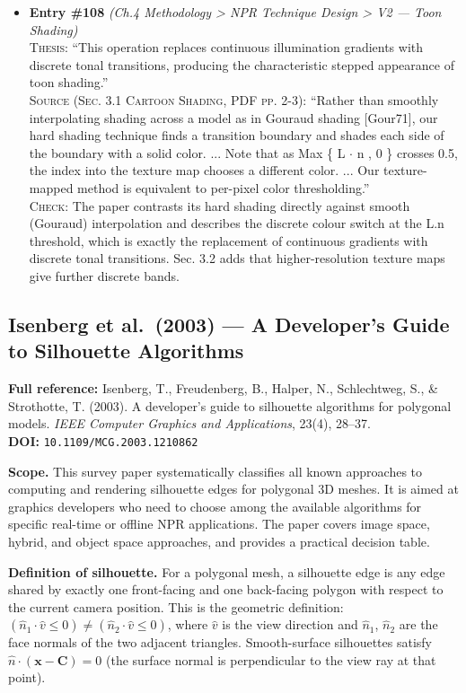 \documentclass[11pt, a4paper]{article}
\begin{document}
\begin{itemize}[leftmargin=1.2em,itemsep=4pt]
\item \textbf{Entry \#108} \textit{(Ch.4 Methodology > NPR Technique Design > V2 — Toon Shading)}\\
\textsc{Thesis:} ``This operation replaces continuous illumination gradients with discrete tonal transitions, producing the characteristic stepped appearance of toon shading.''\\
\textsc{Source (Sec. 3.1 Cartoon Shading, PDF pp. 2-3):} ``Rather than smoothly interpolating shading across a model as in Gouraud shading [Gour71], our hard shading technique finds a transition boundary and shades each side of the boundary with a solid color. ... Note that as Max \{ L $\cdot$ n , 0 \} crosses 0.5, the index into the texture map chooses a different color. ... Our texture-mapped method is equivalent to per-pixel color thresholding.''\\
\textsc{Check:} The paper contrasts its hard shading directly against smooth (Gouraud) interpolation and describes the discrete colour switch at the L.n threshold, which is exactly the replacement of continuous gradients with discrete tonal transitions. Sec. 3.2 adds that higher-resolution texture maps give further discrete bands.
\end{itemize}

\vspace{8pt}
\subsection{Isenberg et al.\ (2003) --- A Developer's Guide to Silhouette Algorithms}

\begin{refbox}
\textbf{Full reference:} Isenberg, T., Freudenberg, B., Halper, N., Schlechtweg, S., \& Strothotte, T. (2003). A developer's guide to silhouette algorithms for polygonal models. \textit{IEEE Computer Graphics and Applications}, 23(4), 28--37.\\[4pt]
\textbf{DOI:} \texttt{10.1109/MCG.2003.1210862}
\end{refbox}

\textbf{Scope.} This survey paper systematically classifies all known approaches to computing and rendering silhouette edges for polygonal 3D meshes. It is aimed at graphics developers who need to choose among the available algorithms for specific real-time or offline NPR applications. The paper covers image space, hybrid, and object space approaches, and provides a practical decision table.

\textbf{Definition of silhouette.} For a polygonal mesh, a silhouette edge is any edge shared by exactly one front-facing and one back-facing polygon with respect to the current camera position. This is the geometric definition: $(\hat{n}_1 \cdot \hat{v} \leq 0) \neq (\hat{n}_2 \cdot \hat{v} \leq 0)$, where $\hat{v}$ is the view direction and $\hat{n}_1$, $\hat{n}_2$ are the face normals of the two adjacent triangles. Smooth-surface silhouettes satisfy $\hat{n} \cdot (\mathbf{x} - \mathbf{C}) = 0$ (the surface normal is perpendicular to the view ray at that point).
\end{document}
